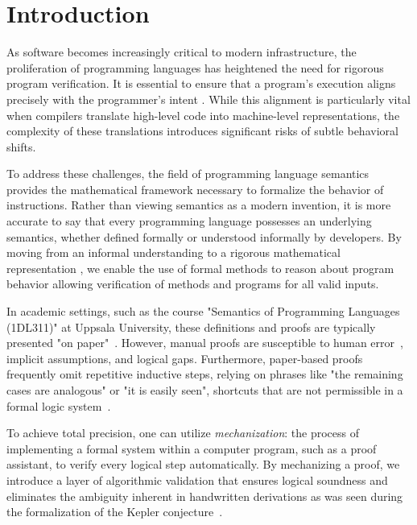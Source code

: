 \chapter{Introduction}
\label{cha:introduction}

As software becomes increasingly critical to modern infrastructure,
the proliferation of programming languages \citep{noauthor_tiobe_nodate}
has heightened the need for rigorous program verification.
It is essential to ensure that a program's execution aligns precisely
with the programmer's intent \citep{ringer_qed_2019}.
While this alignment is particularly vital when compilers translate
high-level code into machine-level representations,
the complexity of these translations introduces significant
risks of subtle behavioral shifts.

To address these challenges, the field of programming language semantics
provides the mathematical framework necessary to formalize the behavior of instructions.
Rather than viewing semantics as a modern invention,
it is more accurate to say that every programming language possesses
an underlying semantics, whether defined formally
or understood informally by developers.
By moving from an informal understanding to a rigorous mathematical
representation \citep{winskel_formal_1993},
we enable the use of formal methods to reason about program behavior
allowing verification of methods and programs for all valid inputs.

In academic settings, such as the course "Semantics of Programming Languages (1DL311)"
at Uppsala University, these definitions and proofs are typically presented
"on paper"~\citep{uppsala_syllabus_2023, uppsala_reading_2023}.
However, manual proofs are susceptible to human error~\citep{reliability_of_proof},
implicit assumptions, and logical gaps.
Furthermore, paper-based proofs frequently omit repetitive inductive steps,
relying on phrases like "the remaining cases are analogous"
or "it is easily seen",
shortcuts that are not permissible in a formal logic system~\citep{andersen_acceptable_2020}.

To achieve total precision, one can utilize \textit{mechanization}:
the process of implementing a formal system within a computer program,
such as a proof assistant, to verify every logical step automatically.
By mechanizing a proof, we introduce a layer of algorithmic validation
that ensures logical soundness and eliminates the ambiguity inherent in
handwritten derivations as was seen during the formalization of the Kepler conjecture~\citep{hales_formal_2017}.

